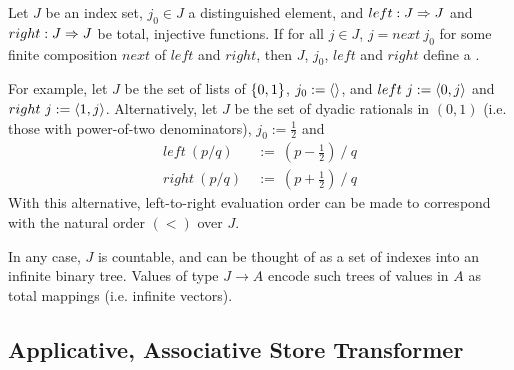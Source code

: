 \begin{definition}
Let $J$ be an index set, $j_0 \in J$ a distinguished element, and $left : J \Rightarrow J$ and $right : J \Rightarrow J$ be total, injective functions. If for all $j \in J$, $j = next~j_0$ for some finite composition $next$ of $left$ and $right$, then $J$, $j_0$, $left$ and $right$ define a .
\end{definition}

For example, let $J$ be the set of lists of $\{{0,1}\}$, $j_0 := \langle{}\rangle$, and $left~j := \langle{0,j}\rangle$ and $right~j := \langle{1,j}\rangle$.
Alternatively, let $J$ be the set of dyadic rationals in $(0,1)$ (i.e. those with power-of-two denominators), $j_0 := \tfrac{1}{2}$ and
\begin{equation}
\begin{aligned}
	left~(p{/}q) &\ := \ (p-\tfrac{1}{2})~{/}~q
\\
	right~(p{/}q) &\ := \ (p+\tfrac{1}{2})~{/}~q
\end{aligned}
\end{equation}
With this alternative, left-to-right evaluation order can be made to correspond with the natural order $(<)$ over $J$.

In any case, $J$ is countable, and can be thought of as a set of indexes into an infinite binary tree.
Values of type $J \to A$ encode such trees of values in $A$ as total mappings (i.e. infinite vectors).

\subsection{Applicative, Associative Store Transformer}

